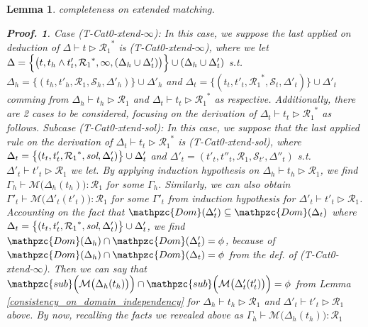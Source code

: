 \documentclass[12pt]{article}
\newtheorem{Lemma}{Lemma}[section]
\newtheorem{Proof}{Proof.}
\begin{document}
\begin{Lemma}{completeness on extended matching.}
\begin{Proof}
    Case (T-Cat0-xtend-$\infty$): In this case, we suppose the last applied
    on deduction of $\Delta \vdash t \triangleright {\mathcal{R}_1}^*$ is
    (T-Cat0-xtend-$\infty$), where we let
    $\Delta = \Bigl\{\bigl(t, t_h \wedge t'_t, {\mathcal{R}_1}^*, \infty,
    (\Delta_h \cup \Delta'_t) \bigr) \Bigr\} \cup (\Delta_h \cup \Delta'_t)$
    s.t. $\Delta_h = \bigl\{(t_h, t'_h, \mathcal{R}_1, \mathcal{S}_h,
    \Delta'_h)\bigr\} \cup \Delta'_h$ and
    $\Delta_t = \bigl\{(t_t, t'_t, {\mathcal{R}_1}^*, \mathcal{S}_t,
    \Delta'_t) \bigr\} \cup \Delta'_t$ comming from
    $\Delta_h \vdash t_h \triangleright \mathcal{R}_1$ and
    $\Delta_t \vdash t_t \triangleright {\mathcal{R}_1}^*$ as respective.
    Additionally, there are 2 cases to be considered, focusing on
    the derivation of $\Delta_t \vdash t_t \triangleright {\mathcal{R}_1}^*$
    as follows.
    Subcase (T-Cat0-xtend-sol): In this case, we suppose that
    the last applied rule on the derivation of
    $\Delta_t \vdash t_t \triangleright {\mathcal{R}_1}^*$ is
    (T-Cat0-xtend-sol), where
    $\Delta_t = \bigl\{(t_t, t'_t, {\mathcal{R}_1}^*, \text{\it sol},
    \Delta'_t) \bigr\} \cup \Delta'_t$ and
    $\Delta'_t = (t'_t, t''_t, \mathcal{R}_1, \mathcal{S}_{t'},
    \Delta''_t)$ s.t. $\Delta'_t \vdash t'_t \triangleright \mathcal{R}_1$
    we let. By applying induction hypothesis on
    $\Delta_h \vdash t_h \triangleright \mathcal{R}_1$, we find
    $\Gamma_h \vdash \mathcal{M}\bigl(\Delta_h(t_h) \bigr) : \mathcal{R}_1$
    for some $\Gamma_h$. Similarly, we can also obtain
    $\Gamma'_t \vdash \mathcal{M}\bigl(\Delta'_t(t'_t) \bigr) :
    \mathcal{R}_1$ for some $\Gamma'_t$ from induction hypothesis for
    $\Delta'_t \vdash t'_t \triangleright \mathcal{R}_1$.
    Accounting on the fact that
    $\mathpzc{Dom}(\Delta'_t) \subseteq \mathpzc{Dom}(\Delta_t)$ where
    $\Delta_t = \bigl\{(t_t, t'_t, {\mathcal{R}_1}^*, \text{\it sol},
    \Delta'_t) \bigr\} \cup \Delta'_t$, we find
    $\mathpzc{Dom}(\Delta_h) \cap \mathpzc{Dom}(\Delta'_t) = \phi$, because
    of $\mathpzc{Dom}(\Delta_h) \cap \mathpzc{Dom}(\Delta_t) = \phi$ from
    the def. of (T-Cat0-xtend-$\infty$). Then we can say that
    $\mathpzc{sub}\Bigl(\mathcal{M}\bigl(\Delta_h(t_h) \bigr) \Bigr) \cap
    \mathpzc{sub}\Bigl(\mathcal{M}\bigl(\Delta'_t(t'_t) \bigr) \Bigr) =
    \phi$ from Lemma \ref{consistency_on_domain_independency} for
    $\Delta_h \vdash t_h \triangleright \mathcal{R}_1$ and
    $\Delta'_t \vdash t'_t \triangleright \mathcal{R}_1$ above. By now,
    recalling the facts we revealed above as
    $\Gamma_h \vdash \mathcal{M}\bigl(\Delta_h(t_h) \bigr) : \mathcal{R}_1$

\end{Proof}
\end{Lemma}
\end{document}
